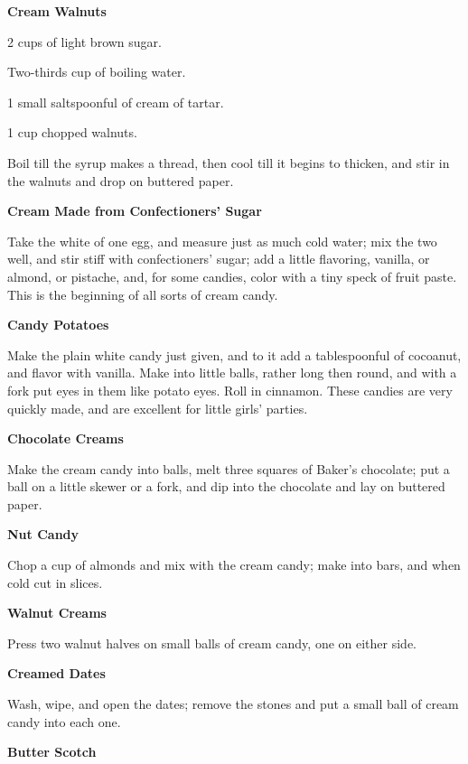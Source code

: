 \documentclass[11pt]{book}
\newcommand{\indpar}{\par\noindent\hspace*{\parindent}}
\newcommand{\ingredient}{\indpar}
\newcommand{\instruction}{\indpar}
\newenvironment{RecipeTitle}{\medskip\begin{center}\large\bf }{\end{center}\smallskip}
\begin{document}
\begin{RecipeTitle}
Cream Walnuts\label{cream_walnuts}
\end{RecipeTitle}
\ingredient  2 cups of light brown sugar.
\ingredient  Two-thirds cup of boiling water.
\ingredient  1 small saltspoonful of cream of tartar.
\ingredient  1 cup chopped walnuts.
\instruction  Boil till the syrup makes a thread, then cool till it begins
to thicken, and stir in the walnuts and drop on buttered
paper.
\begin{RecipeTitle}
Cream Made from Confectioners' Sugar\label{cream_confectioners_sugar}
\end{RecipeTitle}
\instruction  Take the white of one egg, and measure just as much cold
water; mix the two well, and stir stiff with confectioners'
sugar; add a little flavoring, vanilla, or almond, or
pistache, and, for some candies, color with a tiny speck of
fruit paste.  This is the beginning of all sorts of cream
candy.
\begin{RecipeTitle}
Candy Potatoes\label{candy_potatoes}
\end{RecipeTitle}
\instruction  Make the plain white candy just given, and to it add a
tablespoonful of cocoanut, and flavor with vanilla.  Make into
little balls, rather long then round, and with a fork put eyes
in them like potato eyes.  Roll in cinnamon.  These candies
are very quickly made, and are excellent for little girls'
parties.
\begin{RecipeTitle}
Chocolate Creams\label{chocolate_creams}
\end{RecipeTitle}
\instruction  Make the cream candy into balls, melt three squares of
Baker's chocolate; put a ball on a little skewer or a fork,
and dip into the chocolate and lay on buttered paper.
\begin{RecipeTitle}
Nut Candy\label{nut_candy}
\end{RecipeTitle}
\instruction  Chop a cup of almonds and mix with the cream candy; make
into bars, and when cold cut in slices.
\begin{RecipeTitle}
Walnut Creams\label{walnut_creams}
\end{RecipeTitle}
\instruction  Press two walnut halves on small balls of cream candy, one
on either side.
\begin{RecipeTitle}
Creamed Dates\label{creamed_dates}
\end{RecipeTitle}
\instruction  Wash, wipe, and open the dates; remove the stones and put a
small ball of cream candy into each one.
\begin{RecipeTitle}
Butter Scotch\label{butter_scotch}
\end{RecipeTitle}
\end{document}
